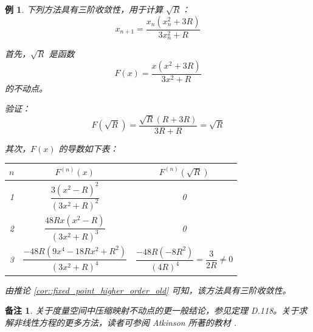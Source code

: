 \documentclass[a4paper]{ctexart}
\newtheorem{remark}{备注}
\newtheorem{example}[theorem]{例}
\numberwithin{theorem}{section}
\numberwithin{equation}{section}
\numberwithin{figure}{section}
\numberwithin{remark}{section}
\begin{document}
\begin{example}
下列方法具有三阶收敛性，用于计算 \( \sqrt{R} \)：
\begin{equation}
x_{n+1} = \frac{x_n (x_n^2 + 3R)}{3x_n^2 + R}
\end{equation}

首先，\( \sqrt{R} \) 是函数
\begin{equation}
F(x) = \frac{x(x^2 + 3R)}{3x^2 + R}
\end{equation}
的不动点。

验证：
\begin{equation}
F(\sqrt{R}) = \frac{\sqrt{R}(R + 3R)}{3R + R} = \sqrt{R}
\end{equation}

其次，\( F(x) \) 的导数如下表：

\begin{tabular}{@{}c|c|c@{}}
\toprule
\( n \) & \( F^{(n)}(x) \) & \( F^{(n)}(\sqrt{R}) \) \\
\midrule
1 & \( \dfrac{3(x^2 - R)^2}{(3x^2 + R)^2} \) & 0 \\
2 & \( \dfrac{48Rx(x^2 - R)}{(3x^2 + R)^3} \) & 0 \\
3 & \( \dfrac{-48R(9x^4 - 18Rx^2 + R^2)}{(3x^2 + R)^4} \) & \( \dfrac{-48R(-8R^2)}{(4R)^4} = \dfrac{3}{2R} \ne 0 \) \\
\bottomrule
\end{tabular}

由推论 \ref{cor::fixed_point_higher_order_old} 可知，该方法具有三阶收敛性。
\end{example}

\begin{remark}
关于度量空间中压缩映射不动点的更一般结论，参见定理 D.118。关于求解非线性方程的更多方法，读者可参阅 Atkinson 所著的教材 \cite[第二章]{Atkinson1989Introduction}.
\end{remark}




\end{document}
